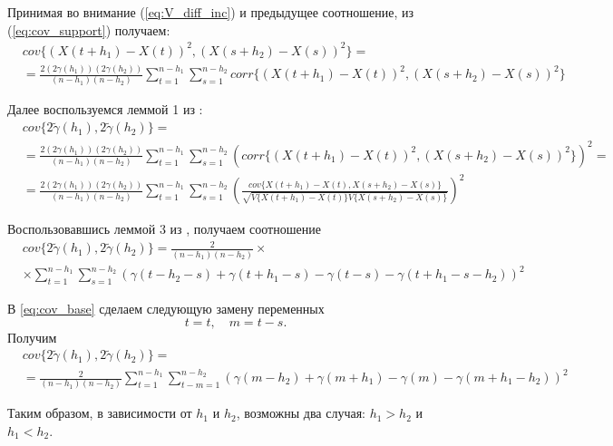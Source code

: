 Принимая во внимание (\ref{eq:V_diff_inc}) и предыдущее соотношение, из (\ref{eq:cov_support}) получаем:
\begin{eqnarray*}
	& cov\{ (X(t + h_1) - X(t))^2, (X(s + h_2) - X(s))^2 \} = \\
	& = \frac{2 (2\gamma(h_1))(2\gamma(h_2))}{(n - h_1)(n - h_2)}\sum_{t = 1}^{n - h_1}\sum_{s = 1}^{n - h_2} corr\{(X(t + h_1) - X(t))^2, (X(s + h_2) - X(s))^2 \}
\end{eqnarray*}

Далее воспользуемся леммой 1 из \cite{tsekhavaya-brest}:
\begin{eqnarray*}
	& cov\{ 2 \tilde{\gamma}(h_1), 2 \tilde{\gamma}(h_2) \} = \\
	& = \frac{2 (2\gamma(h_1))(2\gamma(h_2))}{(n - h_1)(n - h_2)}\sum_{t = 1}^{n - h_1}\sum_{s = 1}^{n - h_2} (corr\{(X(t + h_1) - X(t))^2, (X(s + h_2) - X(s))^2 \})^2 = \\
	& = \frac{2 (2\gamma(h_1))(2\gamma(h_2))}{(n - h_1)(n - h_2)}\sum_{t = 1}^{n - h_1}\sum_{s = 1}^{n - h_2} ( \frac{cov\{ X(t + h_1) - X(t), X(s + h_2) - X(s) \}}{\sqrt{V\{ X( t + h_1) - X(t) \} V\{ X(s + h_2) - X(s) \}}} )^2
\end{eqnarray*}

Воспользовавшись леммой 3 из \cite{tsekhavaya-brest}, получаем соотношение
\begin{eqnarray}
\nonumber
\label{eq:cov_base}
	& cov\{ 2 \tilde{\gamma}(h_1), 2 \tilde{\gamma}(h_2) \} = \frac{2}{(n - h_1)(n - h_2)} \times \\
	& \times \sum_{t = 1}^{n - h_1}\sum_{s = 1}^{n - h_2} (\gamma(t - h_2 - s) + \gamma(t + h_1 - s) - \gamma(t - s) - \gamma(t + h_1 - s - h_2))^2
\end{eqnarray}

В \eqref{eq:cov_base} сделаем следующую замену переменных
\begin{equation*}
	t = t, \quad m = t - s.
\end{equation*}
Получим
\begin{eqnarray}
\nonumber
\label{eq:cov_split}
	& cov\{ 2 \tilde{\gamma}(h_1), 2 \tilde{\gamma}(h_2) \} = \\
	& = \frac{2}{(n - h_1) (n - h_2)} \sum_{t = 1}^{n - h_1}\sum_{t - m = 1}^{n - h_2} (\gamma(m - h_2) + \gamma(m + h_1) - \gamma(m) - \gamma(m + h_1 - h_2))^2
\end{eqnarray}

Таким образом, в зависимости от $h_1$ и $h_2$, возможны два случая: $h_1 > h_2$ и $h_1 < h_2$.

